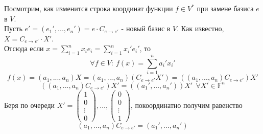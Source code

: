     Посмотрим, как изменится строка координат функции $f\in V^{*}$ при замене базиса $e$ в $V$.\\
    Пусть $e' = (e_1',...,e_n') = e\cdot C_{e\rightarrow e'}$ - новый базис в $V$. 
    Как известно, $X = C_{e\rightarrow e'} \cdot X'$.\\
    Отсюда если $x = \sum \limits_{i=1}^n x_i e_i = \sum \limits_{i=1}^n x_i' e_i'$, то
    $$\forall f \in V: \ f(x) = \sum \limits_{i=1}^n a_i' x_i'$$  
    $$f(x) = (a_1,...,a_n)X = (a_1,...,a_n)(C_{e\rightarrow e'}X') = ((a_1,...,a_n)C_{e\rightarrow e'})X'$$ 
    $$((a_1,...,a_n)C_{e\rightarrow e'})X' = ((a_1',...,a_n'))X' \ \ \forall X' \in \mathbb{F}^n$$ 
    Беря по очереди $X' = \left( \begin{smallmatrix} 1 \\ 0 \\ \vdots \\ 0 \end{smallmatrix} \right), \dots , \left( \begin{smallmatrix} 0 \\ 0 \\ \vdots \\ 1 \end{smallmatrix}\right)$, покоординатно получим равенство \[(a_1,...,a_n)C_{e\rightarrow e'} = (a_1',...,a_n')\]

